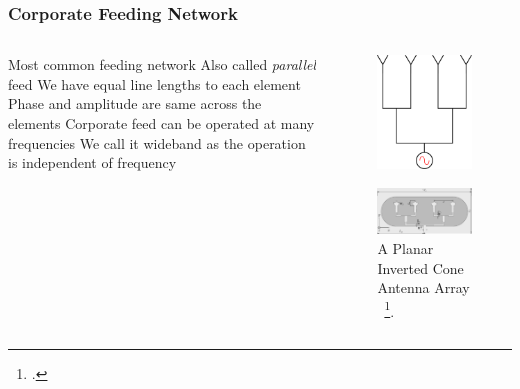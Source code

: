 \documentclass[10pt]{beamer}
\begin{document}
\begin{frame}
    \frametitle{Corporate Feeding Network}
    \begin{columns}[] %
        \begin{column}{.6\textwidth}
            \begin{outline}
                \1 Most common feeding network
                \2 Also called \textit{parallel} feed
                \1 We have equal line lengths to each element
                \2 Phase and amplitude are same across the elements
                \1 Corporate feed can be operated at many frequencies
                \2 We call it wideband as the operation is independent of frequency
            \end{outline}   
        \end{column}
        \begin{column}{.4\textwidth}
            \begin{figure}[h!]
                \centering
                \includegraphics[width=.5\textwidth]{corporate.pdf}
            \end{figure}
            \begin{figure}[h!]
                \centering
                \includegraphics[width=.95\textwidth]{PICA Array.pdf}
                \caption{A Planar Inverted Cone Antenna Array \, \footcite{abohmra_ultrawideband_2021}.}
            \end{figure}
        \end{column}%
    \end{columns}
\end{frame}
\end{document}
